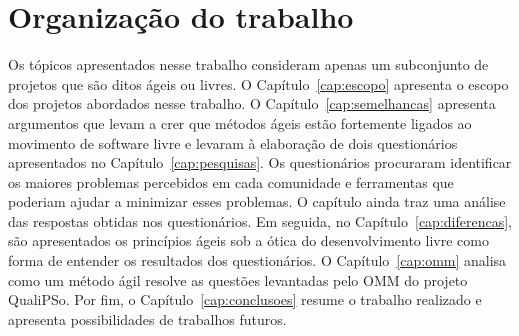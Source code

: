 \section{Organização do trabalho}
\label{sec:organizacao_trabalho}

Os tópicos apresentados nesse trabalho consideram apenas um
subconjunto de projetos que são ditos ágeis ou livres. O
Capítulo~\ref{cap:escopo} apresenta o escopo dos projetos abordados
nesse trabalho. O Capítulo~\ref{cap:semelhancas} apresenta argumentos
que levam a crer que métodos ágeis estão fortemente ligados ao
movimento de software livre e levaram à elaboração de dois
questionários apresentados no Capítulo~\ref{cap:pesquisas}. Os
questionários procuraram identificar os maiores problemas percebidos
em cada comunidade e ferramentas que poderiam ajudar a minimizar esses
problemas. O capítulo ainda traz uma análise das respostas obtidas nos
questionários.  Em seguida, no Capítulo~\ref{cap:diferencas}, são
apresentados os princípios ágeis sob a ótica do desenvolvimento livre
como forma de entender os resultados dos questionários. O
Capítulo~\ref{cap:omm} analisa como um método ágil resolve as questões
levantadas pelo OMM do projeto QualiPSo.  Por fim, o
Capítulo~\ref{cap:conclusoes} resume o trabalho realizado e apresenta
possibilidades de trabalhos futuros.
